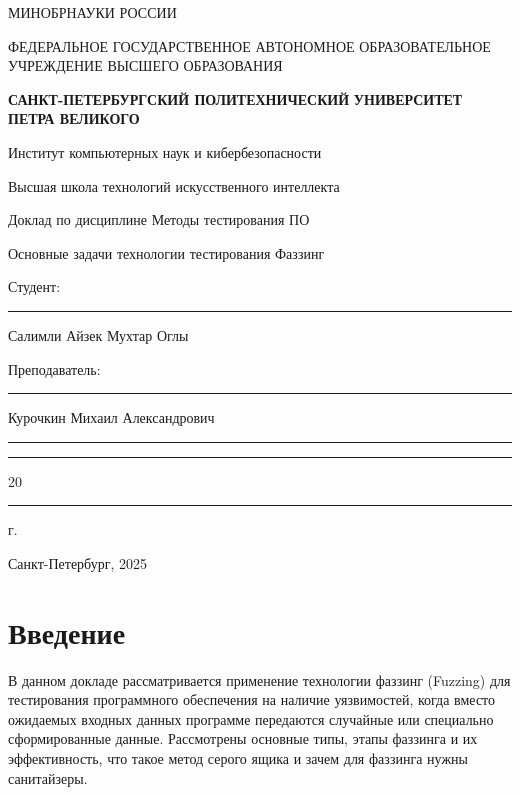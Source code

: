 \documentclass[areasetadvanced]{scrartcl}
\begin{document}
\setlength{\parindent}{1.25cm}
\setlength{\parskip}{\baselineskip}
	\thispagestyle{empty}
	\begin{center}
		\large{МИНОБРНАУКИ РОССИИ} \par
		\vspace{0.3cm}
		\normalsize
		{ФЕДЕРАЛЬНОЕ ГОСУДАРСТВЕННОЕ АВТОНОМНОЕ ОБРАЗОВАТЕЛЬНОЕ УЧРЕЖДЕНИЕ ВЫСШЕГО ОБРАЗОВАНИЯ} \par
		\vspace{0.3cm}
		\textbf{\guillemotleft САНКТ-ПЕТЕРБУРГСКИЙ ПОЛИТЕХНИЧЕСКИЙ}
		\textbf{УНИВЕРСИТЕТ ПЕТРА ВЕЛИКОГО\guillemotright} \par
		\vspace{0.3cm}
		{Институт компьютерных наук и кибербезопасности}\par
		{Высшая школа технологий искусственного интеллекта}\par
	\end{center}
	\vfill
	\begin{center}
		{\large Доклад по дисциплине \guillemotleft Методы тестирования ПО\guillemotright}\par
		{\huge  Основные задачи технологии тестирования Фаззинг }
         
	\end{center}
	\vfill
	\begin{flushleft}
		Студент: \hspace{1.8cm} \rule[0pt]{2.5cm}{0.5pt}\hfill Салимли Айзек Мухтар Оглы\par
		\vspace{1.5cm}
		Преподаватель: \hspace{0.55cm} \rule[0pt]{2.5cm}{0.5pt}\hfill  Курочкин Михаил Александрович
	\end{flushleft}
	\vspace{0.5cm}
	\begin{flushright}
		\guillemotleft \rule[0pt]{0.8cm}{0.5pt}\guillemotright \rule[0pt]{2cm}{0.5pt} 20\rule[0pt]{0.5cm}{0.5pt} г.
	\end{flushright}
	\vfill
	\begin{center}
		Санкт-Петербург, 2025
	\end{center}
	\newpage
	\tableofcontents
	\newpage
\section*{Введение}
    В данном докладе рассматривается применение технологии фаззинг (Fuzzing) для тестирования
    программного обеспечения на наличие уязвимостей, когда вместо ожидаемых входных данных
    программе передаются случайные или специально сформированные данные.
    Рассмотрены основные типы, этапы фаззинга и их эффективность, что такое метод серого ящика и
    зачем для фаззинга нужны санитайзеры.
\newpage
\end{document}
